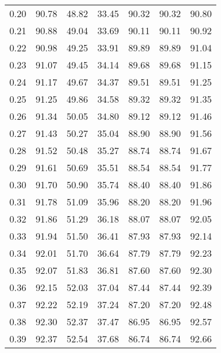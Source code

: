 \begin{tabular}{|c|c|c|c|c|c|c|}
      0.20 &     90.78 &     48.82 &      33.45 &   90.32 &      90.32 &         90.80 \\
      0.21 &     90.88 &     49.04 &      33.69 &   90.11 &      90.11 &         90.92 \\
      0.22 &     90.98 &     49.25 &      33.91 &   89.89 &      89.89 &         91.04 \\
      0.23 &     91.07 &     49.45 &      34.14 &   89.68 &      89.68 &         91.15 \\
      0.24 &     91.17 &     49.67 &      34.37 &   89.51 &      89.51 &         91.25 \\
      0.25 &     91.25 &     49.86 &      34.58 &   89.32 &      89.32 &         91.35 \\
      0.26 &     91.34 &     50.05 &      34.80 &   89.12 &      89.12 &         91.46 \\
      0.27 &     91.43 &     50.27 &      35.04 &   88.90 &      88.90 &         91.56 \\
      0.28 &     91.52 &     50.48 &      35.27 &   88.74 &      88.74 &         91.67 \\
      0.29 &     91.61 &     50.69 &      35.51 &   88.54 &      88.54 &         91.77 \\
      0.30 &     91.70 &     50.90 &      35.74 &   88.40 &      88.40 &         91.86 \\
      0.31 &     91.78 &     51.09 &      35.96 &   88.20 &      88.20 &         91.96 \\
      0.32 &     91.86 &     51.29 &      36.18 &   88.07 &      88.07 &         92.05 \\
      0.33 &     91.94 &     51.50 &      36.41 &   87.93 &      87.93 &         92.14 \\
      0.34 &     92.01 &     51.70 &      36.64 &   87.79 &      87.79 &         92.23 \\
      0.35 &     92.07 &     51.83 &      36.81 &   87.60 &      87.60 &         92.30 \\
      0.36 &     92.15 &     52.03 &      37.04 &   87.44 &      87.44 &         92.39 \\
      0.37 &     92.22 &     52.19 &      37.24 &   87.20 &      87.20 &         92.48 \\
      0.38 &     92.30 &     52.37 &      37.47 &   86.95 &      86.95 &         92.57 \\
      0.39 &     92.37 &     52.54 &      37.68 &   86.74 &      86.74 &         92.66 \\

\end{tabular}
